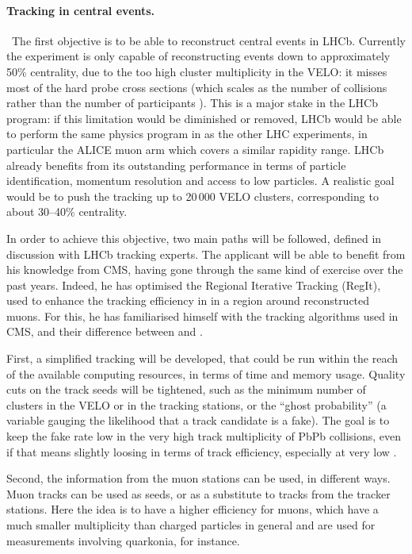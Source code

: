 \documentclass[a4paper,11pt]{article}
\begin{document}
\paragraph{Tracking in central \pbpb events. }\ 
The first objective is to be able to reconstruct central events in LHCb. Currently the experiment is only capable of reconstructing events down to approximately 50\% centrality, due to the too high cluster multiplicity in the VELO: it misses most of the hard probe cross sections (which scales as the number of collisions \ncoll rather than the number of participants \npart). This is a major stake in the LHCb \pbpb program: if this limitation would be diminished or removed, LHCb would be able to perform the same physics program in \pbpb as the other LHC experiments, in particular the ALICE muon arm which covers a similar rapidity range. LHCb already benefits from its outstanding performance in terms of particle identification, momentum resolution and access to low \pt particles. A realistic goal would be to push the tracking up to 20\,000 VELO clusters, corresponding to about 30--40\% centrality.

In order to achieve this objective, two main paths will be followed, defined in discussion with LHCb tracking experts. The applicant will be able to benefit from his knowledge from CMS, having gone through the same kind of exercise over the past years. Indeed, he has optimised the Regional Iterative Tracking (RegIt), used to enhance the tracking efficiency in \pbpb in a region around reconstructed muons. For this, he has familiarised himself with the tracking algorithms used in CMS, and their difference between \pp and \pbpb.

First, a simplified tracking will be developed, that could be run within the reach of the available computing resources, in terms of time and memory usage. Quality cuts on the track seeds will be tightened, such as the minimum number of clusters in the VELO or in the tracking stations, or the ``ghost probability'' (a variable gauging the likelihood that a track candidate is a fake). The goal is to keep the fake rate low in the very high track multiplicity of PbPb collisions, even if that means slightly loosing in terms of track efficiency, especially at very low \pt.

Second, the information from the muon stations can be used, in different ways. Muon tracks can be used as seeds, or as a substitute to tracks from the tracker stations. Here the idea is to have a higher efficiency for muons, which have a much smaller multiplicity than charged particles in general and are used for measurements involving quarkonia, for instance. 
\end{document}
